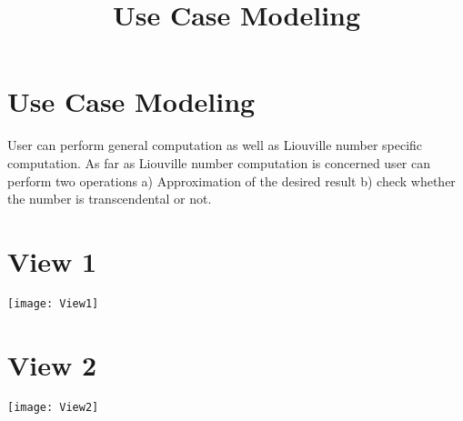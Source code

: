 \documentclass[13pt letterpaper]{article}
\begin{document}
\title{\textbf{Use Case Modeling}}
\maketitle
\section{Use Case Modeling}
User can perform general computation as well as Liouville number specific computation. As far as Liouville number computation is concerned user can perform two operations a) Approximation of the desired result b) check whether the number is transcendental or not.  

\section{View 1}
\texttt{[image: View1]}
\section{View 2}
\texttt{[image: View2]}
\end{document}
